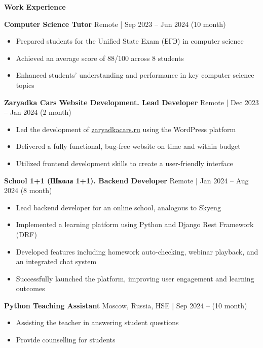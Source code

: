 \begin{center}
    \textbf{Work Experience}
\end{center}

\textbf{Computer Science Tutor} \hfill Remote | Sep 2023 – Jun 2024 (10 month)
\begin{itemize}[noitemsep, topsep=0pt, partopsep=0pt, parsep=0pt]
    \item Prepared students for the Unified State Exam (ЕГЭ) in computer science
    \item Achieved an average score of 88/100 across 8 students
    \item Enhanced students' understanding and performance in key computer science topics
\end{itemize}

\textbf{Zaryadka Cars Website Development. Lead Developer} \hfill Remote | Dec 2023 – Jan 2024 (2 month)
\begin{itemize}[noitemsep, topsep=0pt, partopsep=0pt, parsep=0pt]
    \item Led the development of \href{https://zaryadkacars.ru}{zaryadkacars.ru} using the WordPress platform
    \item Delivered a fully functional, bug-free website on time and within budget
    \item Utilized frontend development skills to create a user-friendly interface
\end{itemize}

\textbf{School 1+1 (Школа 1+1). Backend Developer} \hfill Remote | Jan 2024 – Aug 2024 (8 month)
\begin{itemize}[noitemsep, topsep=0pt, partopsep=0pt, parsep=0pt]
    \item Lead backend developer for an online school, analogous to Skyeng
    \item Implemented a learning platform using Python and Django Rest Framework (DRF)
    \item Developed features including homework auto-checking, webinar playback, and an integrated chat system
    \item Successfully launched the platform, improving user engagement and learning outcomes
\end{itemize}

\textbf{Python Teaching Assistant} \hfill Moscow, Russia, HSE | Sep 2024 – (10 month)
\begin{itemize}[noitemsep, topsep=0pt, partopsep=0pt, parsep=0pt]
    \item Assisting the teacher in answering student questions
    \item Provide counselling for students
\end{itemize}

